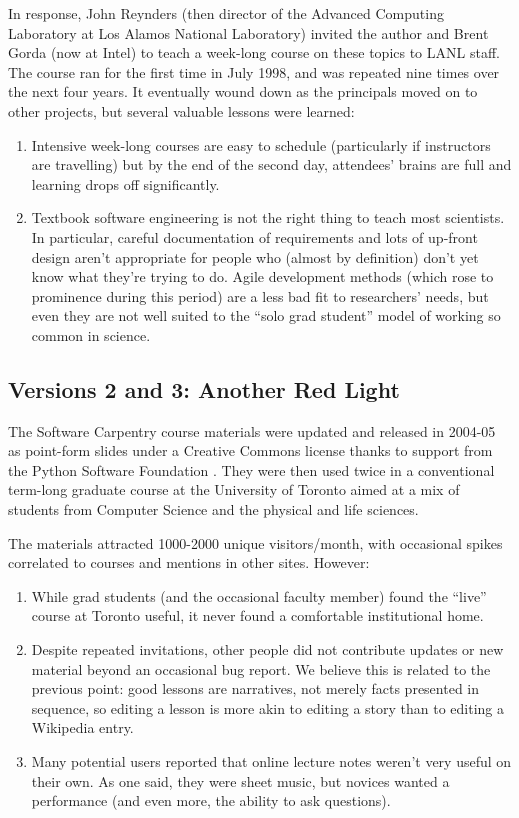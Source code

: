 \documentclass{article}
\begin{document}
In response, John Reynders (then director of the Advanced Computing
Laboratory at Los Alamos National Laboratory) invited the author and
Brent Gorda (now at Intel) to teach a week-long course on these topics
to LANL staff. The course ran for the first time in July 1998, and was
repeated nine times over the next four years. It eventually wound down
as the principals moved on to other projects, but several valuable
lessons were learned:

\begin{enumerate}
\item
  Intensive week-long courses are easy to schedule (particularly if
  instructors are travelling) but by the end of the second day,
  attendees' brains are full and learning drops off significantly.
\item
  Textbook software engineering is not the right thing to teach most
  scientists. In particular, careful documentation of requirements and
  lots of up-front design aren't appropriate for people who (almost by
  definition) don't yet know what they're trying to do. Agile
  development methods (which rose to prominence during this period) are
  a less bad fit to researchers' needs, but even they are not well
  suited to the ``solo grad student'' model of working so common in
  science.
\end{enumerate}

\subsection{Versions 2 and 3: Another Red Light}

The Software Carpentry course materials were updated and released in
2004-05 as point-form slides under a Creative Commons license thanks to
support from the Python Software Foundation \cite{wilson2006b}. They were
then used twice in a conventional term-long graduate course at the
University of Toronto aimed at a mix of students from Computer Science
and the physical and life sciences.

The materials attracted 1000-2000 unique visitors/month, with occasional
spikes correlated to courses and mentions in other sites. However:

\begin{enumerate}
\item
  While grad students (and the occasional faculty member) found the
  ``live'' course at Toronto useful, it never found a comfortable
  institutional home.
\item
  Despite repeated invitations, other people did not contribute updates
  or new material beyond an occasional bug report. We believe this is
  related to the previous point: good lessons are narratives, not merely
  facts presented in sequence, so editing a lesson is more akin to
  editing a story than to editing a Wikipedia entry.
\item
  Many potential users reported that online lecture notes weren't very
  useful on their own. As one said, they were sheet music, but novices
  wanted a performance (and even more, the ability to ask questions).
\end{enumerate}
\end{document}

